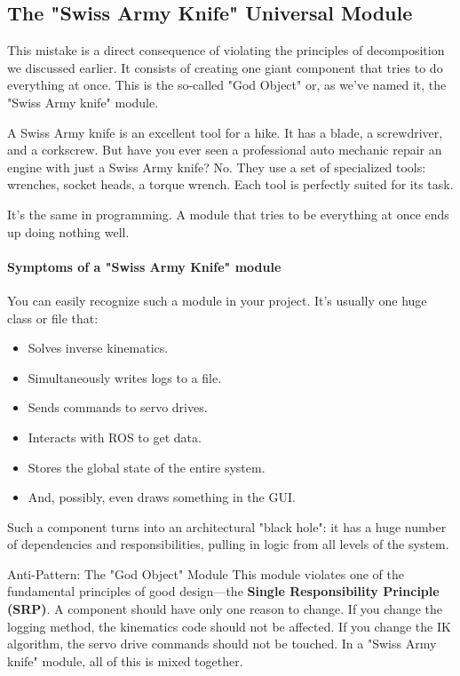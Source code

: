 \subsection{The "Swiss Army Knife" Universal Module}

This mistake is a direct consequence of violating the principles of decomposition we discussed earlier. It consists of creating one giant component that tries to do everything at once. This is the so-called "God Object" or, as we've named it, the "Swiss Army knife" module.

A Swiss Army knife is an excellent tool for a hike. It has a blade, a screwdriver, and a corkscrew. But have you ever seen a professional auto mechanic repair an engine with just a Swiss Army knife? No. They use a set of specialized tools: wrenches, socket heads, a torque wrench. Each tool is perfectly suited for its task.

It's the same in programming. A module that tries to be everything at once ends up doing nothing well.

\paragraph{Symptoms of a "Swiss Army Knife" module}

You can easily recognize such a module in your project. It's usually one huge class or file that:
\begin{itemize}
    \item Solves inverse kinematics.
    \item Simultaneously writes logs to a file.
    \item Sends commands to servo drives.
    \item Interacts with ROS to get data.
    \item Stores the global state of the entire system.
    \item And, possibly, even draws something in the GUI.
\end{itemize}

Such a component turns into an architectural "black hole": it has a huge number of dependencies and responsibilities, pulling in logic from all levels of the system.

\begin{dangerbox}{Anti-Pattern: The "God Object" Module}
This module violates one of the fundamental principles of good design—the \textbf{Single Responsibility Principle (SRP)}. A component should have only one reason to change. If you change the logging method, the kinematics code should not be affected. If you change the IK algorithm, the servo drive commands should not be touched. In a "Swiss Army knife" module, all of this is mixed together.
\end{dangerbox}

